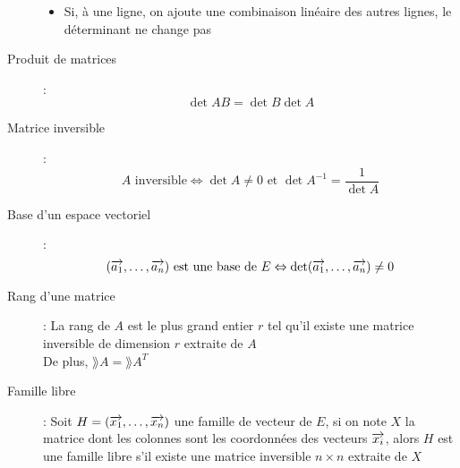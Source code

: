 \begin{description}
\begin{itemize}
    \item Si, à une ligne, on ajoute une combinaison linéaire des autres lignes, le déterminant ne change pas
\end{itemize}
\item[Produit de matrices] : \[ \det AB=\det B\det A \]
\item[Matrice inversible] :
    \[
        A \textrm{ inversible} \Leftrightarrow \det A\ne 0
        \textrm{ et }
        \det A^{-1}=\dfrac{1}{\det A}
    \]
\item[Base d'un espace vectoriel] : 
    \[
        (\overrightarrow{a_1},\dots, \overrightarrow{a_n})\textrm{ est une base de } E
        \Leftrightarrow \det(\overrightarrow{a_1},\dots, \overrightarrow{a_n})\ne 0
    \]
\item[Rang d'une matrice] : La rang de $A$ est le plus grand entier $r$ tel qu'il existe une matrice inversible de dimension $r$ extraite de $A$\\
    De plus, $\rang A=\rang A^T$
\item[Famille libre] : Soit $H=(\overrightarrow{x_1},\dots,\overrightarrow{x_n})$ une famille de vecteur de $E$, si on note $X$ la matrice dont les colonnes sont les coordonnées
    des vecteurs $\overrightarrow{x_i}$, alors $H$ est une famille libre s'il existe une matrice inversible $n\times n$ extraite de $X$
\end{description}
